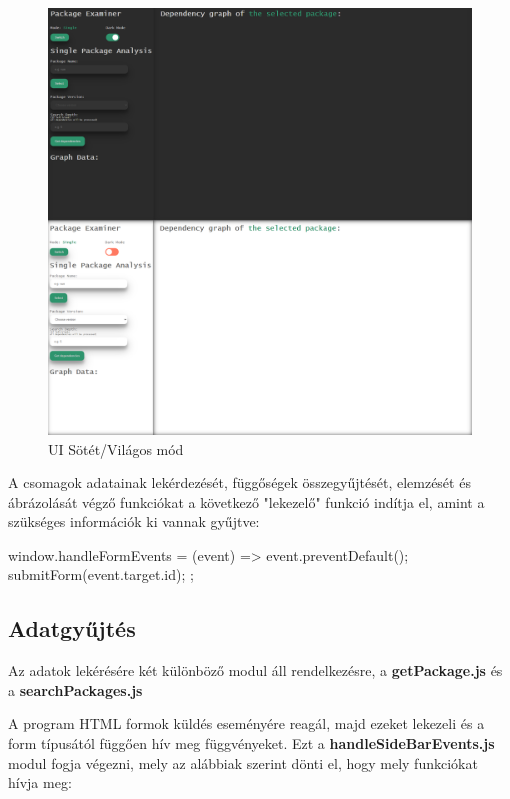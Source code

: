 \begin{figure}[!h]
	\centering
	\includegraphics[scale=0.1]{images/ui_darkmode.png}
	\caption{UI Sötét/Világos mód}
	\label{fig:ui_darkmode}
\end{figure}

A csomagok adatainak lekérdezését, függőségek összegyűjtését, elemzését és ábrázolását végző funkciókat a következő "lekezelő" funkció indítja el, amint a szükséges információk ki vannak gyűjtve:

\begin{cpp}
window.handleFormEvents = (event) => {
	event.preventDefault();
	submitForm(event.target.id);
};
\end{cpp}

\subsection{Adatgyűjtés}

Az adatok lekérésére két különböző modul áll rendelkezésre, a \textbf{getPackage.js} és a \textbf{searchPackages.js}

A program HTML formok küldés eseményére reagál, majd ezeket lekezeli és a form típusától függően hív meg függvényeket. Ezt a \textbf{handleSideBarEvents.js} modul fogja végezni, mely az alábbiak szerint dönti el, hogy mely funkciókat hívja meg:

